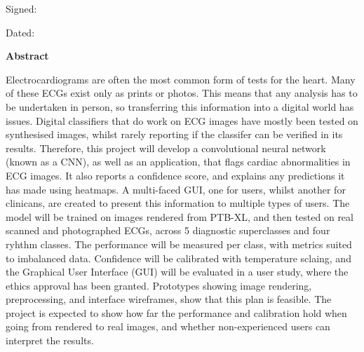 \documentclass[oneside,a4paper,11pt]{book}
\begin{document}
Signed:  

\vspace{1.5cm}

Dated: 




\newpage
{}
\thispagestyle{plain}
\begin{center}
	{
	\Large
	\textbf{\mytitle}
	
	\vspace{0.4cm}
	\textbf{\mystudentname}
	
	\vspace{0.9cm}
	\textbf{Abstract}
	\vspace{0.5cm}
    }

    \begin{justify}
    Electrocardiograms are often the most common form of tests for the heart. Many of these ECGs exist only as prints or photos. This means that any analysis has to be undertaken in person, so transferring this information into a digital world has issues. Digital classifiers that do work on ECG images have mostly been tested on synthesised images, whilst rarely reporting if the classifer can be verified in its results. Therefore, this project will develop a convolutional neural network (known as a CNN), as well as an application, that flags cardiac abnormalities in ECG images. It also reports a confidence score, and explains any predictions it has made using heatmaps. A multi-faced GUI, one for users, whilst another for clinicans, are created to present this information to multiple types of users. The model will be trained on images rendered from PTB-XL, and then tested on real scanned and photographed ECGs, across 5 diagnostic superclasses and four ryhthm classes. The performance will be measured per class, with metrics suited to imbalanced data. Confidence will be calibrated with temperature sclaing, and the Graphical User Interface (GUI) will be evaluated in a user study, where the ethics approval has been granted. Prototypes showing image rendering, preprocessing, and interface wireframes, show that this plan is feasible. The project is expected to show how far the performance and calibration hold when going from rendered to real images, and whether non-experienced users can interpret the results. 
    \end{justify}
	
\end{center}


\cleardoublepage
\pagestyle{plain}
\end{document}
